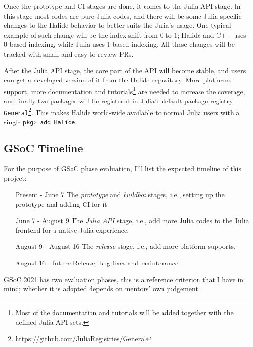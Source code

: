 \documentclass{article}
\begin{document}
Once the prototype and CI stages are done, it comes to the Julia API stage.
In this stage most codes are pure Julia codes, and there will be some Julia-specific changes to the Halide behavior to better suits the Julia's usage. One typical example of such change will be the index shift from $0$ to $1$; Halide and C++ uses $0$-based indexing, while Julia uses $1$-based indexing. All these changes will be tracked with small and easy-to-review PRs.

After the Julia API stage, the core part of the API will become stable, and users can get a developed version of it from the Halide repository. More platforms support, more documentation and tutorials\footnote{Most of the documentation and tutorials will be added together with the defined Julia API sets.} are needed to increase the coverage, and finally two packages will be registered in Julia's default package registry \lstinline{General}\footnote{\url{https://github.com/JuliaRegistries/General}}. This makes Halide world-wide available to normal Julia users with a single \lstinline{pkg> add Halide}.


\subsection{GSoC Timeline}

For the purpose of GSoC phase evaluation, I'll list the expected timeline of this project:

\begin{enumerate}
    \item [Present - June 7] The \emph{prototype} and \emph{buildbot} stages, i.e., setting up the prototype and adding CI for it.
    \item [June 7 - August 9] The \emph{Julia API} stage, i.e., add more Julia codes to the Julia frontend for a native Julia experience.
    \item [August 9 - August 16] The \emph{release} stage, i.e., add more platform supports.
    \item [August 16 - future] Release, bug fixes and maintenance.
\end{enumerate}

GSoC 2021 has two evaluation phases, this is a reference criterion that I have in mind; whether it is adopted depends on mentors' own judgement:
\end{document}
